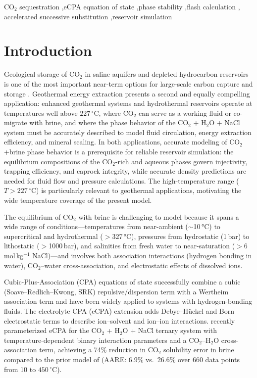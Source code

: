 \documentclass[preprint,12pt,authoryear]{elsarticle}
\begin{document}
\begin{frontmatter}
\begin{keyword}
CO$_2$ sequestration \sep eCPA equation of state \sep phase stability \sep flash calculation \sep
accelerated successive substitution \sep reservoir simulation
\end{keyword}

\end{frontmatter}

\linenumbers

\section{Introduction}
\label{sec:intro}

Geological storage of CO$_2$ in saline aquifers and depleted hydrocarbon reservoirs is one
of the most important near-term options for large-scale carbon capture and storage
\citep{Metz2005, Orr2004}.
Geothermal energy extraction presents a second and equally compelling application:
enhanced geothermal systems and hydrothermal reservoirs operate at temperatures well above
$227\,^\circ$C, where CO$_2$ can serve as a working fluid or co-migrate with brine, and where the
phase behavior of the CO$_2$ + H$_2$O + NaCl system must be accurately described to model
fluid circulation, energy extraction efficiency, and mineral scaling.
In both applications, accurate modeling of CO$_2$+brine phase behavior is a prerequisite
for reliable reservoir simulation: the equilibrium compositions of the CO$_2$-rich and aqueous
phases govern injectivity, trapping efficiency, and caprock integrity, while accurate density
predictions are needed for fluid flow and pressure calculations.
The high-temperature range ($T > 227\,^\circ$C) is particularly relevant to geothermal applications,
motivating the wide temperature coverage of the present model.

The equilibrium of CO$_2$ with brine is challenging to model because it spans a wide range of
conditions---temperatures from near-ambient ($\sim$10\,°C) to supercritical and hydrothermal
($>$327\,°C), pressures from hydrostatic (1\,bar) to lithostatic ($>$1000\,bar), and salinities
from fresh water to near-saturation ($>$6\,mol\,kg$^{-1}$ NaCl)---and involves both association
interactions (hydrogen bonding in water), CO$_2$--water cross-association, and electrostatic
effects of dissolved ions.

Cubic-Plus-Association (CPA) equations of state \citep{Kontogeorgis1996} successfully combine
a cubic (Soave--Redlich--Kwong, SRK) repulsive/dispersion term with a Wertheim association
term \citep{Wertheim1984} and have been widely applied to systems with hydrogen-bonding fluids.
The electrolyte CPA (eCPA) extension \citep{MaribMogensen2015} adds Debye--Hückel and Born
electrostatic terms to describe ion--solvent and ion--ion interactions.
\citet{Coelho2025} recently parameterized eCPA for the CO$_2$ + H$_2$O + NaCl ternary system
with temperature-dependent binary interaction parameters and a CO$_2$--H$_2$O
cross-association term, achieving a 74\% reduction in CO$_2$ solubility error in brine
compared to the prior model of \citet{MaribMogensen2015} (AARE: 6.9\% vs.\ 26.6\% over
660 data points from 10 to $450\,^\circ$C).
\end{document}

